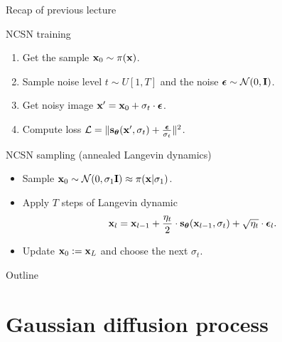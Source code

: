 \begin{frame}{Recap of previous lecture}
	\begin{block}{NCSN training}
		\begin{enumerate}
			\item Get the sample $\mathbf{x}_0 \sim \pi(\mathbf{x})$.
			\item Sample noise level $t \sim U[1, T]$ and the noise $\boldsymbol{\epsilon} \sim \mathcal{N}(0, \mathbf{I})$.
			\item Get noisy image $\mathbf{x}' = \mathbf{x}_0 + \sigma_t \cdot \boldsymbol{\epsilon}$.
			\item Compute loss $ \mathcal{L} = \| \mathbf{s}_{\boldsymbol{\theta}}(\mathbf{x}', \sigma_t) + \frac{\boldsymbol{\epsilon}}{\sigma_t} \|^2 $.
		\end{enumerate}
	\end{block}
	\begin{block}{NCSN sampling (annealed Langevin dynamics)}
		\begin{itemize}
			\item Sample $\mathbf{x}_0 \sim \mathcal{N}(0, \sigma_1 \mathbf{I}) \approx \pi(\mathbf{x} | \sigma_1)$.
			\item Apply $T$ steps of Langevin dynamic
			\vspace{-0.2cm}
			\[
				\mathbf{x}_l = \mathbf{x}_{l-1} + \frac{\eta_t}{2} \cdot \mathbf{s}_{\boldsymbol{\theta}}(\mathbf{x}_{l - 1}, \sigma_t) + \sqrt{\eta_t} \cdot \boldsymbol{\epsilon}_l.
			\] 
			\vspace{-0.5cm}
			\item Update $\mathbf{x}_0 := \mathbf{x}_L$ and choose the next $\sigma_t$.
		\end{itemize}
	\end{block}
\end{frame}
\begin{frame}{Outline}
	\tableofcontents
\end{frame}
\section{Gaussian diffusion process}
